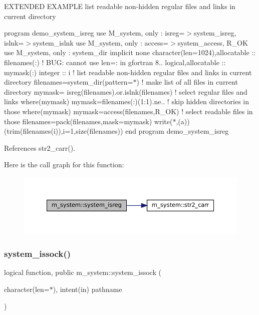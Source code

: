 E\+X\+T\+E\+N\+D\+ED E\+X\+A\+M\+P\+LE list readable non-\/hidden regular files and links in current directory

program demo\+\_\+system\+\_\+isreg use M\+\_\+system, only \+: isreg=$>$system\+\_\+isreg, islnk=$>$system\+\_\+islnk use M\+\_\+system, only \+: access=$>$system\+\_\+access, R\+\_\+\+OK use M\+\_\+system, only \+: system\+\_\+dir implicit none character(len=1024),allocatable \+:\+: filenames(\+:) ! B\+UG\+: cannot use len=\+: in gfortran 8.. logical,allocatable \+:\+: mymask(\+:) integer \+:\+: i ! list readable non-\/hidden regular files and links in current directory filenames=system\+\_\+dir(pattern=\textquotesingle{}$\ast$\textquotesingle{}) ! make list of all files in current directory mymask= isreg(filenames).or.\+islnk(filenames) ! select regular files and links where(mymask) mymask=filenames(\+:)(1\+:1).ne.\textquotesingle{}.\textquotesingle{} ! skip hidden directories in those where(mymask) mymask=access(filenames,\+R\+\_\+\+O\+K) ! select readable files in those filenames=pack(filenames,mask=mymask) write($\ast$,\textquotesingle{}(a)\textquotesingle{})(trim(filenames(i)),i=1,size(filenames)) end program demo\+\_\+system\+\_\+isreg 

References str2\+\_\+carr().

Here is the call graph for this function\+:\nopagebreak
\begin{figure}[H]
\begin{center}
\leavevmode
\includegraphics[width=350pt]{namespacem__system_a8ea0d0430227af61b8083b4e7d6e597d_cgraph}
\end{center}
\end{figure}
\mbox{\label{namespacem__system_af6eb5074fe74552bc7a5e7d00f459087}} 
\subsubsection{\texorpdfstring{system\+\_\+issock()}{system\_issock()}}
{\footnotesize\ttfamily logical function, public m\+\_\+system\+::system\+\_\+issock (\begin{DoxyParamCaption}\item[{character(len=$\ast$), intent(in)}]{pathname }\end{DoxyParamCaption})}




